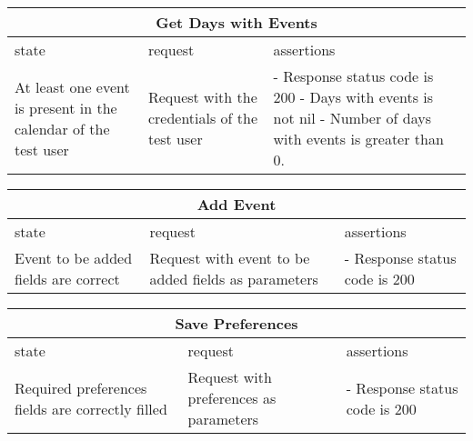 \begin{center}
	\begin{tabular}{|p{}|p{}|p{}|}
		\hline
		\multicolumn{3}{c}{Get Days with Events}\\
		
		\hline
		state & request & assertions \\
		
		\hline
		At least one event is present in the calendar of the test user &
		Request with the credentials of the test user & 
		- Response status code is 200 \newline
		- Days with events is not nil \newline
		- Number of days with events is greater than 0.
		\\
		
		\hline
	\end{tabular}
\end{center}

\begin{center}
	\begin{tabular}{|p{}|p{}|p{}|}
		\hline
		\multicolumn{3}{c}{Add Event}\\
		
		\hline
		state & request & assertions \\
		
		\hline
		Event to be added fields are correct &
		Request with event to be added fields as parameters & 
		- Response status code is 200 \newline
		\\
		
		\hline
	\end{tabular}
\end{center}


\begin{center}
	\begin{tabular}{|p{}|p{}|p{}|}
		\hline
		\multicolumn{3}{c}{Save Preferences}\\
		
		\hline
		state & request & assertions \\
		
		\hline
		Required preferences fields are correctly filled &
		Request with preferences as parameters & 
		- Response status code is 200 \newline
		\\
		
		\hline
	\end{tabular}
\end{center}

